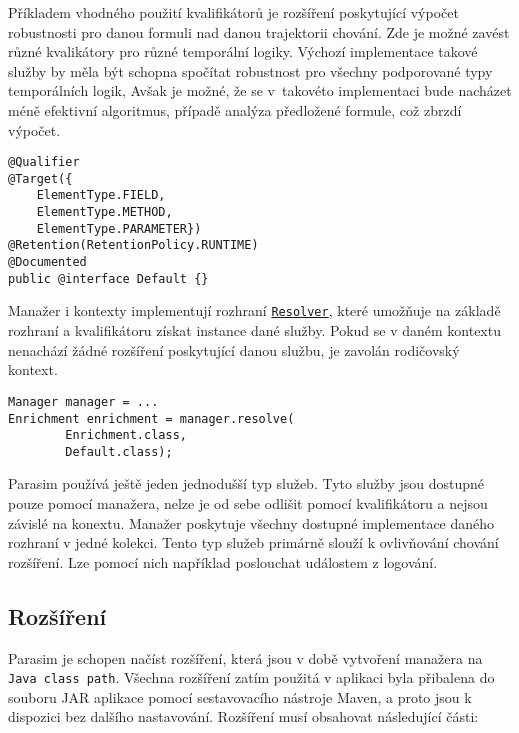 Příkladem vhodného použití kvalifikátorů je rozšíření poskytující
vý\-počet robustnosti pro danou formuli nad danou trajektorii chování. Zde je možné zavést
různé kvalikátory pro různé temporální logiky. Výchozí implementace takové služby
by měla být schopna spočítat robustnost pro všechny podporované typy temporálních logik,
Avšak je možné, že se v~takovéto implementaci bude nacházet méně efektivní algoritmus,
případě analýza předložené formule, což zbrzdí výpočet.

\begin{lstlisting}[label={code:qualifier}, caption={Kvalikátor}]
@Qualifier
@Target({
	ElementType.FIELD,
	ElementType.METHOD,
	ElementType.PARAMETER})
@Retention(RetentionPolicy.RUNTIME)
@Documented
public @interface Default {}
\end{lstlisting}

Manažer i kontexty implementují rozhraní \href{https://github.com/sybila/parasim/blob/2.0.0.Final/core/src/main/java/org/sybila/parasim/core/api/Resolver.java}{\texttt{Resolver}},
které umožňuje na základě rozhraní a kvalifikátoru získat instance dané služby.
Pokud se v daném kontextu nenachází žádné rozšíření poskytující danou službu,
je zavolán rodičovský kontext. 

\begin{lstlisting}[label={code:resolve}, caption={Získání instance služby}]
Manager manager = ...
Enrichment enrichment = manager.resolve(
		Enrichment.class,
		Default.class);
\end{lstlisting}

Parasim používá ještě jeden jednodušší typ služeb. Tyto služby jsou dostupné pouze
pomocí manažera, nelze je od sebe odlišit pomocí kvalifikátoru a nejsou závislé na konextu.
Manažer poskytuje všechny dostupné implementace daného rozhraní v jedné kolekci. Tento typ služeb
primárně  slouží k ovlivňování cho\-vání rozšíření. Lze pomocí nich například
poslouchat událostem z logování.

\subsection{Rozšíření}

Parasim je schopen načíst rozšíření, která jsou v době vytvoření manažera na \texttt{Java class path}.
Všechna rozšíření zatím použitá v aplikaci byla přibalena do souboru JAR aplikace pomocí sestavovacího
nástroje Maven, a proto jsou k dispozici bez dalšího nasta\-vo\-vá\-ní. Rozšíření musí obsahovat
následující části:

